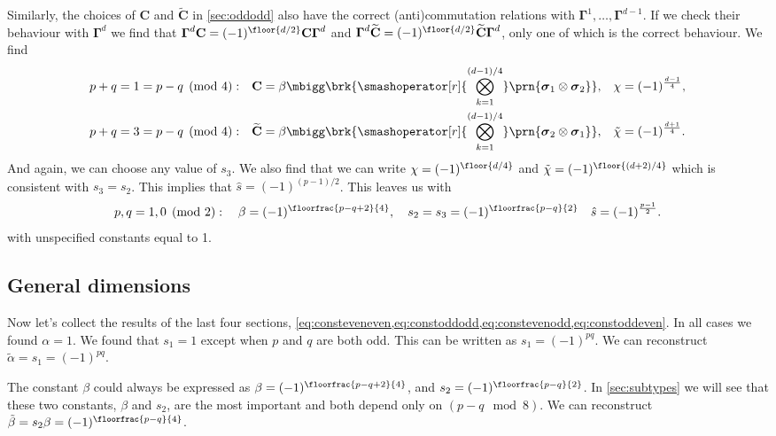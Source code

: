 \documentclass[11pt]{article}
\newcommand{\Gammab}{\boldsymbol{\Gamma}}
\renewcommand{\C}{\mathbf{C}}
\newcommand{\Ct}{\widetilde{\C}}
\newcommand{\sigmab}{\boldsymbol{\sigma}}
\newcommand{\alphat}{\tilde{\alpha}}
\newcommand{\betat}{\tilde{\beta}}
\newcommand{\chit}{\tilde{\chi}}
\newcommand{\sh}{\hat{s}}
\begin{document}
Similarly, the choices of \(\C\) and \(\Ct\) in \cref{sec:oddodd} also have the correct (anti)commutation relations with \(\Gammab^1, \ldots, \Gammab^{d-1}\).
If we check their behaviour with \(\Gammab^d\) we find that \(\Gammab^d \C = (-1)^{\floor{d/2}}\C \Gammab^d\) and \(\Gammab^d \Ct = (-1)^{\floor{d/2}} \Ct \Gammab^d\), only one of which is the correct behaviour.
We find
%
\begin{equation*}
\begin{aligned}
  p+q &= 1 = p-q \pmod 4: &
  \C &= \beta
        \mbigg\brk{\smashoperator[r]{\bigotimes_{k=1}^{(d-1)/4}}
        \prn{\sigmab_1 \otimes \sigmab_2}}, &
  \chi &= (-1)^{\frac{d-1}{4}},
  \\
  p+q &= 3 = p-q \pmod 4: &
  \Ct &= \beta
        \mbigg\brk{\smashoperator[r]{\bigotimes_{k=1}^{(d-1)/4}}
        \prn{\sigmab_2 \otimes \sigmab_1}}, &
  \chit &= (-1)^{\frac{d+1}{4}}.
\end{aligned}
\end{equation*}
%
And again, we can choose any value of \(s_3\).
We also find that we can write \(\chi = (-1)^{\floor{d/4}}\) and \(\chit = (-1)^{\floor{(d+2)/4}}\) which is consistent with \(s_3 = s_2\).
This implies that \(\sh = (-1)^{(p-1)/2}\).
This leaves us with
%
\begin{equation}\label{eq:constoddeven}
  p, q = 1,0 \pmod 2 : \quad
  \beta = (-1)^{\floorfrac{p-q+2}{4}}, \quad
  s_2 = s_3 = (-1)^{\floorfrac{p-q}{2}} \quad
  \sh = (-1)^{\frac{p-1}{2}}.
\end{equation}
%
with unspecified constants equal to 1.



\subsection{General dimensions}\label{sec:constgendim}

Now let's collect the results of the last four sections,
\cref{eq:consteveneven,eq:constoddodd,eq:constevenodd,eq:constoddeven}.
In all cases we found \(\alpha = 1\).
We found that \(s_1 = 1\) except when \(p\) and \(q\) are both odd.
This can be written as \(s_1 = (-1)^{pq}\).
We can reconstruct \(\alphat = s_1 = (-1)^{pq}\).

The constant \(\beta\) could always be expressed as \(\beta = (-1)^{\floorfrac{p-q+2}{4}}\),
and \(s_2 = (-1)^{\floorfrac{p-q}{2}}\).
In \cref{sec:subtypes} we will see that these two constants, 
\(\beta\) and \(s_2\), are the most important and both depend only on
\( (p - q \mod 8) \).
We can reconstruct \(\betat = s_2 \beta = (-1)^{\floorfrac{p-q}{4}}\).
\end{document}
